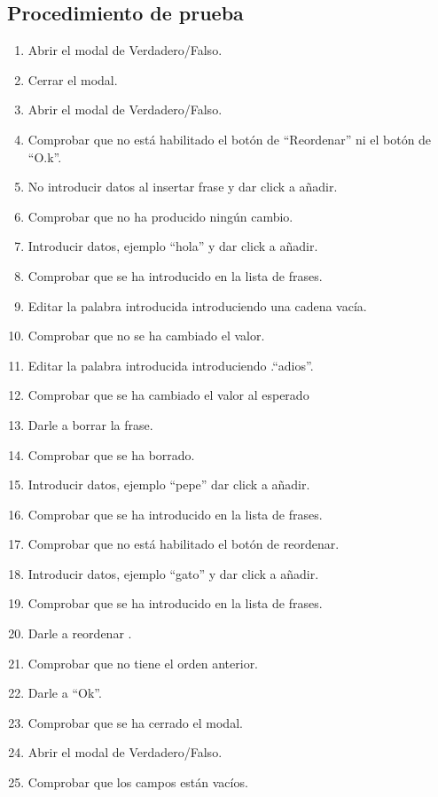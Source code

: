 \subsection{Procedimiento de prueba}
\label{procedimientoPruebas:v/f}
\begin{enumerate}
    \item Abrir el modal de Verdadero/Falso.
    \item Cerrar el modal.
    \item Abrir el modal de Verdadero/Falso.
    \item Comprobar que no está habilitado el botón de ``Reordenar'' ni el botón de ``O.k''.
    \item No introducir datos al insertar frase y dar click a añadir.
    \item Comprobar que no ha producido ningún cambio.
    \item Introducir datos, ejemplo ``hola''  y dar click a añadir.
    \item Comprobar que se ha introducido en la lista de frases.
    \item Editar la palabra introducida introduciendo una cadena vacía.
    \item Comprobar que no se ha cambiado el valor.
    \item Editar la palabra introducida introduciendo .“adios”.
    \item Comprobar que se ha cambiado el valor al esperado
    \item Darle a borrar la frase.
    \item Comprobar que se ha borrado.
    \item Introducir datos, ejemplo ``pepe'' dar click a añadir.
    \item Comprobar que se ha introducido en la lista de frases.
    \item Comprobar que no está habilitado el botón de reordenar.
    \item Introducir datos, ejemplo ``gato'' y dar click a añadir.
    \item Comprobar que se ha introducido en la lista de frases.
    \item Darle a reordenar .
    \item Comprobar que no tiene el orden anterior.
    \item Darle a ``Ok''.
    \item Comprobar que se ha cerrado el modal.
    \item Abrir el modal de Verdadero/Falso.
    \item Comprobar que los campos están vacíos.
  \end{enumerate}

